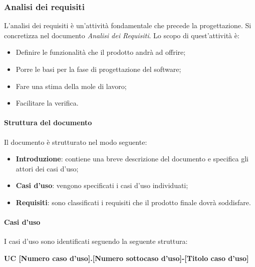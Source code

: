 \subsubsection{Analisi dei requisiti}
L’analisi dei requisiti è un’attività fondamentale che precede la progettazione. 
Si concretizza nel documento \textit{Analisi dei Requisiti}. Lo scopo di quest’attività è:
    \begin{itemize}
        \item Definire le funzionalità che il prodotto andrà ad offrire;
        \item Porre le basi per la fase di progettazione del software;
        \item Fare una stima della mole di lavoro;
        \item Facilitare la verifica. 
    \end{itemize}

\paragraph{Struttura del documento} Il documento è strutturato nel modo seguente:
    \begin{itemize}
        \item \textbf{Introduzione}: contiene una breve descrizione del documento e specifica gli attori dei casi d’uso;
		\item \textbf{Casi d’uso}: vengono specificati i casi d’uso individuati;
		\item \textbf{Requisiti}: sono classificati i requisiti che il prodotto finale dovrà soddisfare.
    \end{itemize}

\paragraph{Casi d’uso} 

I casi d’uso sono identificati seguendo la seguente struttura:

\begin{center}\textbf{UC [Numero caso d’uso].[Numero sottocaso d’uso]-[Titolo caso d’uso]}\end{center}

